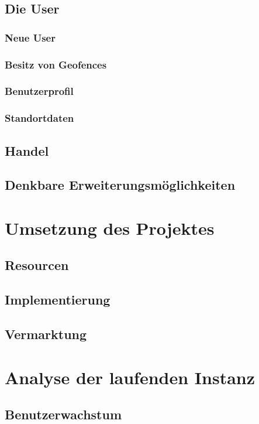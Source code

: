 \documentclass{scrreprt}
\begin{document}
\section{Die User}
\subsection{Neue User}
\subsection{Besitz von Geofences}
\subsection{Benutzerprofil}
\subsection{Standortdaten}

\section{Handel}

\section{Denkbare Erweiterungsmöglichkeiten}

\chapter{Umsetzung des Projektes}
\section{Resourcen}
\section{Implementierung}
\section{Vermarktung}

\chapter{Analyse der laufenden Instanz}
\section{Benutzerwachstum}
\end{document}
